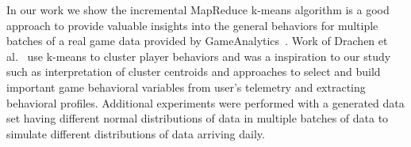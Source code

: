 In our work we show the incremental MapReduce k-means algorithm is a good approach to provide valuable insights into the general behaviors for multiple batches of a real game data provided by GameAnalytics~\citep{GA2013}. Work of Drachen et al.~\citep{Drachen:2012, Drachen:2013} use k-means to cluster player behaviors and was a inspiration to our study such as interpretation of cluster centroids and approaches to select and build important game behavioral variables from user's telemetry and extracting behavioral profiles. Additional experiments were performed with a generated data set having different normal distributions of data in multiple batches of data to simulate different distributions of data arriving daily. 